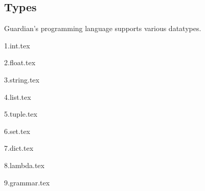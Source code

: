 
\subsection{Types}
{
	Guardian's programming language supports various datatypes.
	
	{1.int.tex}
	
	{2.float.tex}
	
	{3.string.tex}
	
	{4.list.tex}
	
	{5.tuple.tex}
	
	{6.set.tex}
	
	{7.dict.tex}
	
	{8.lambda.tex}
	
	{9.grammar.tex}
}

